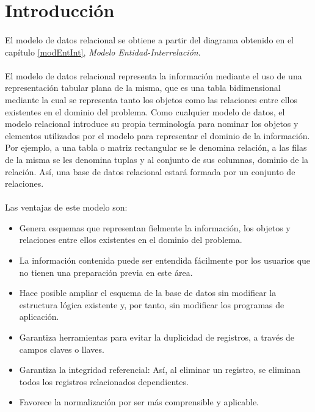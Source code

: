 \section{Introducción}

   \paragraph{}El modelo de datos relacional se obtiene a partir del diagrama
   obtenido en el capítulo \ref{modEntInt}, \textit{Modelo
   Entidad-Interrelación}.

   \paragraph{}El modelo de datos relacional representa la información mediante
   el uso de una representación tabular plana de la misma, que es una tabla
   bidimensional mediante la cual se representa tanto los objetos como las
   relaciones entre ellos existentes en el dominio del problema. Como cualquier
   modelo de datos, el modelo relacional introduce su propia terminología para
   nominar los objetos y elementos utilizados por el modelo para representar el
   dominio de la información. Por ejemplo, a una tabla o matriz rectangular se
   le denomina relación, a las filas de la misma se les denomina tuplas y al
   conjunto de sus columnas, dominio de la relación. Así, una base de datos
   relacional estará formada por un conjunto de relaciones.

   \paragraph{}Las ventajas de este modelo son:

   \begin{itemize}
    \item Genera esquemas que representan fielmente la información, los objetos
    y relaciones entre ellos existentes en el dominio del problema.
    \item La información contenida puede ser entendida fácilmente por los
    usuarios que no tienen una preparación previa en este área.
    \item Hace posible ampliar el esquema de la base de datos sin modificar la
    estructura lógica existente y, por tanto, sin modificar los programas de
    aplicación.
    \item Garantiza herramientas para evitar la duplicidad de registros, a
    través de campos claves o llaves.
    \item Garantiza la integridad referencial: Así, al eliminar un registro,
    se eliminan todos los registros relacionados dependientes.
    \item Favorece la normalización por ser más comprensible y aplicable.
   \end{itemize}

